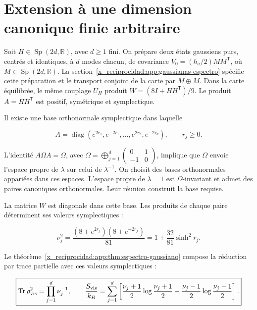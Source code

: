 \section{Extension à une dimension canonique finie arbitraire}

Soit \(H\in\operatorname{Sp}(2d,\mathbb R)\), avec \(d\geq1\) fini. On prépare deux états gaussiens purs, centrés et identiques, à \(d\) modes chacun, de covariance \(V_0=(\hbar_a/2)MM^{\mathsf T}\), où \(M\in\operatorname{Sp}(2d,\mathbb R)\). La section~\ref{x_reciprocidad:app:gaussianas-espectro} spécifie cette préparation et le transport conjoint de la carte par \(M\oplus M\). Dans la carte équilibrée, le même couplage \(U_H\) produit \(W=(8I+HH^{\mathsf T})/9\). Le produit \(A=HH^{\mathsf T}\) est positif, symétrique et symplectique.

Il existe une base orthonormale symplectique dans laquelle


\[
A=\operatorname{diag}(e^{2r_1},e^{-2r_1},\ldots,
e^{2r_d},e^{-2r_d}),\qquad r_j\ge0.
\]



L’identité \(A\Omega A=\Omega\), avec \(\Omega=\bigoplus_{j=1}^d\left(\begin{smallmatrix}0&1\\-1&0\end{smallmatrix}\right)\), implique que \(\Omega\) envoie l’espace propre de \(\lambda\) sur celui de \(\lambda^{-1}\). On choisit des bases orthonormales appariées dans ces espaces. L’espace propre de \(\lambda=1\) est \(\Omega\)-invariant et admet des paires canoniques orthonormales. Leur réunion construit la base requise.

La matrice \(W\) est diagonale dans cette base. Les produits de chaque paire déterminent ses valeurs symplectiques :



\begin{equation}
\boxed{\nu_j^2=
\frac{(8+e^{2r_j})(8+e^{-2r_j})}{81}
=1+\frac{32}{81}\sinh^2r_j.}
\label{x_reciprocidad:nuc12:eq:6.1}
\end{equation}



Le théorème~\ref{x_reciprocidad:app:thm:espectro-gaussiano} compose la réduction par trace partielle avec ces valeurs symplectiques :



\begin{equation}
\boxed{\operatorname{Tr}\rho_{\rm vis}^2=\prod_{j=1}^d\nu_j^{-1},
\qquad
\frac{S_{\rm vis}}{k_B}=\sum_{j=1}^d
\left[\frac{\nu_j+1}{2}\log\frac{\nu_j+1}{2}
-\frac{\nu_j-1}{2}\log\frac{\nu_j-1}{2}\right].}
\label{x_reciprocidad:nuc12:eq:6.2}
\end{equation}



